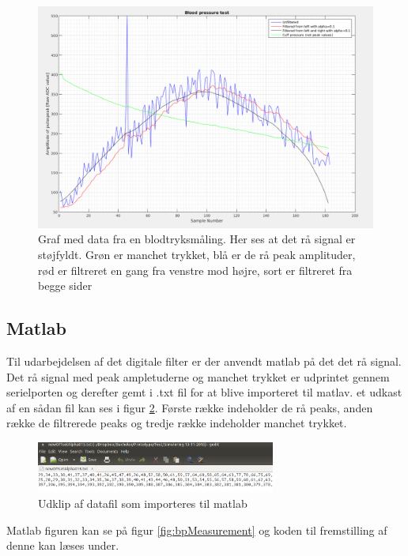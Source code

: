\begin{figure}[H]
	\includegraphics[width=\textwidth]{billeder/4_11_2016_udenMap.png}
	\caption{Graf med data fra en blodtryksmåling. Her ses at det rå signal 	er støjfyldt. Grøn er manchet trykket, blå er de rå peak amplituder, rød er filtreret en gang fra venstre mod højre, sort er filtreret fra begge sider 	}\label{fig:filterWithoutMap}
\end{figure}

\subsection{Matlab} \label{title:Matlab}
Til udarbejdelsen af det digitale filter er der anvendt matlab på det det rå signal. Det rå signal med peak ampletuderne og manchet trykket er udprintet gennem serielporten og derefter gemt i .txt fil for at blive importeret til matlav. et udkast af en sådan fil kan ses i figur \ref{fig:dataFileExample}. Første række indeholder de rå peaks, anden række de filtrerede peaks og tredje række indeholder manchet trykket.
\begin{figure}[H]
	\centering
	\includegraphics[width=0.7\textwidth]{billeder/dataFileExample.png}
	\caption{Udklip af datafil som importeres til matlab}\label{fig:dataFileExample}
\end{figure}

Matlab figuren kan se på figur \ref{fig:bpMeasurement} og koden til fremstilling af denne kan læses under.

